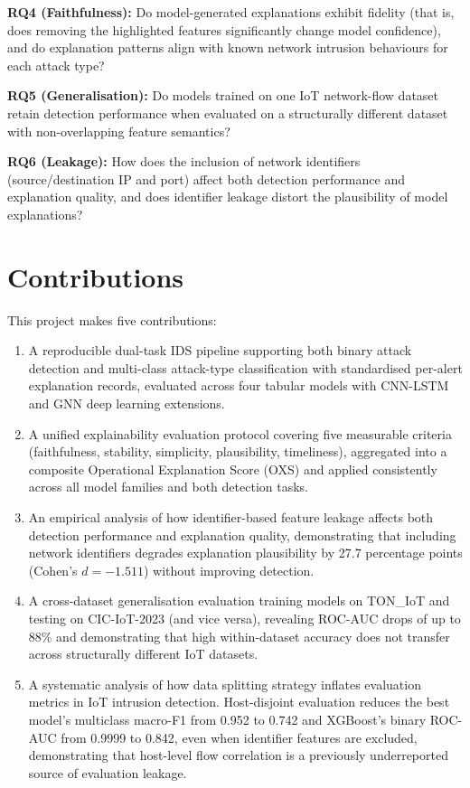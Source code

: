\documentclass[12pt,a4paper]{report}
\begin{document}
\noindent\textbf{RQ4 (Faithfulness):} Do model-generated explanations exhibit fidelity (that is, does removing the highlighted features significantly change model confidence), and do explanation patterns align with known network intrusion behaviours for each attack type?

\noindent\textbf{RQ5 (Generalisation):} Do models trained on one IoT network-flow dataset retain detection performance when evaluated on a structurally different dataset with non-overlapping feature semantics?

\noindent\textbf{RQ6 (Leakage):} How does the inclusion of network identifiers (source/destination IP and port) affect both detection performance and explanation quality, and does identifier leakage distort the plausibility of model explanations?

\section{Contributions}
\label{sec:contributions}

This project makes five contributions:
\begin{enumerate}
  \item A reproducible dual-task IDS pipeline supporting both binary attack detection and multi-class attack-type classification with standardised per-alert explanation records, evaluated across four tabular models with CNN-LSTM and GNN deep learning extensions.
  \item A unified explainability evaluation protocol covering five measurable criteria (faithfulness, stability, simplicity, plausibility, timeliness), aggregated into a composite Operational Explanation Score (OXS) and applied consistently across all model families and both detection tasks.
  \item An empirical analysis of how identifier-based feature leakage affects both detection performance and explanation quality, demonstrating that including network identifiers degrades explanation plausibility by 27.7 percentage points (Cohen's $d = -1.511$) without improving detection.
  \item A cross-dataset generalisation evaluation training models on TON\_IoT and testing on CIC-IoT-2023 (and vice versa), revealing ROC-AUC drops of up to 88\% and demonstrating that high within-dataset accuracy does not transfer across structurally different IoT datasets.
  \item A systematic analysis of how data splitting strategy inflates evaluation metrics in IoT intrusion detection. Host-disjoint evaluation reduces the best model's multiclass macro-F1 from 0.952 to 0.742 and XGBoost's binary ROC-AUC from 0.9999 to 0.842, even when identifier features are excluded, demonstrating that host-level flow correlation is a previously underreported source of evaluation leakage.
\end{enumerate}
\end{document}
